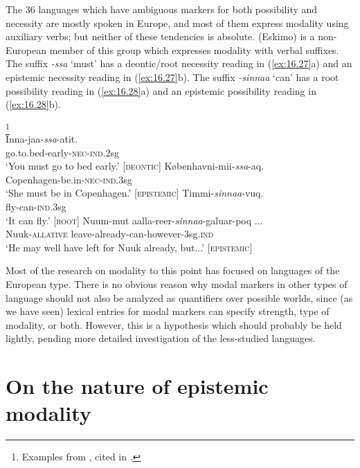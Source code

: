 The 36 languages which have ambiguous markers for both possibility and necessity are mostly spoken in Europe, and most of them express modality using auxiliary verbs; but neither of these tendencies is absolute.  (Eskimo) is a non-European member of this group which expresses modality with verbal suffixes. The suffix \textit{-ssa} ‘must’ has a deontic/root necessity reading in (\ref{ex:16.27}a) and an epistemic necessity reading in (\ref{ex:16.27}b). The suffix \textit{-sinnaa} ‘can’ has a root possibility reading in (\ref{ex:16.28}a) and an epistemic possibility reading in (\ref{ex:16.28}b).


\ea \label{ex:16.27}
\footnote{Examples from \citet[292–294, p.c.]{Fortescue1984}, cited in \citet{vanderAuweraAmmann2013}.} \\ 
\ea  \gll Inna-jaa-\textit{ssa}-atit.\\
go.to.bed-early-\textsc{nec-ind}.2sg\\
\glt ‘You must go to bed early.’ \hfill  [\textsc{deontic}]
\ex \gll Københavni-mii-\textit{ssa}-aq.\\
Copenhagen-be.in-\textsc{nec-ind}.3sg\\
\glt ‘She must be in Copenhagen.’ \hfill  [\textsc{epistemic}]
\z 
\ex \label{ex:16.28} \gll Timmi-\textit{sinnaa}-vuq.\\
fly-can-\textsc{ind}.3sg\\
\glt ‘It can fly.’ \hfill  [\textsc{root}]
\ex \gll  Nuum-mut  aalla-reer-\textit{sinnaa}-galuar-poq ...\\
Nuuk-\textsc{allative}  leave-already-can-however-3sg.\textsc{ind}\\
\glt ‘He may well have left for Nuuk already, but...’ \hfill  [\textsc{epistemic}]
\z


Most of the research on modality to this point has focused on languages of the European type. There is no obvious reason why modal markers in other types of language should not also be analyzed as quantifiers over possible worlds, since (as we have seen) lexical entries for modal markers can specify strength, type of modality, or both. However, this is a hypothesis which should probably be held lightly, pending more detailed investigation of the less-studied languages.


\section{On the nature of epistemic modality}\label{sec:16.5}

